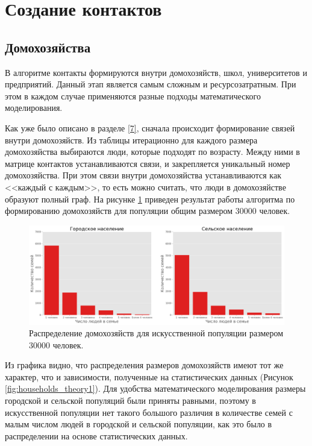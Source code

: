 \documentclass[14pt,a4paper]{article}
\begin{document}
\newpage
\section{Создание контактов}\label{6}
\subsection{Домохозяйства}\label{5}
В алгоритме контакты формируются внутри домохозяйств, школ, университетов и предприятий. Данный этап является самым сложным и ресурсозатратным. При этом в каждом случае применяются разные подходы математического моделирования. 

Как уже было описано в разделе \ref{7}, сначала происходит формирование связей внутри домохозяйств. Из таблицы итерационно для каждого размера домохозяйства выбираются люди, которые подходят по возрасту. Между ними в матрице контактов устанавливаются связи, и закрепляется уникальный номер домохозяйства. При этом связи внутри домохозяйства устанавливаются как <<каждый с каждым>>, то есть можно считать, что люди в домохозяйстве образуют полный граф. На рисунке  \ref{fig:households_distibution_generated} приведен результат работы алгоритма по формированию домохозяйств для популяции общим размером 30000 человек.

\begin{figure}[h!]
	\centering
	\includegraphics[width=1.\textwidth]{img/households_distibution_generated.png}
	\caption{Распределение домохозяйств для искусственной популяции размером 30000 человек.}
	\label{fig:households_distibution_generated}
\end{figure}

Из графика видно, что распределения размеров домохозяйств имеют тот же характер, что и зависимости, полученные на статистических данных (Рисунок \ref{fig:households_theory1}). Для удобства математического моделирования размеры городской и сельской популяций были приняты равными, поэтому в искусственной популяции нет такого большого различия в количестве семей с малым числом людей в городской и сельской популяции, как это было в распределении на основе статистических данных.
\end{document}
